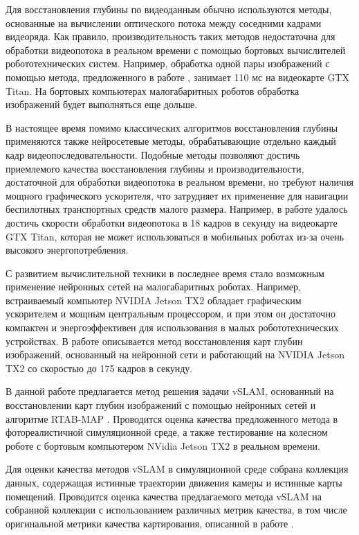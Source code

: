 \documentclass{mipt-thesis-ms}
\begin{document}
	Для восстановления глубины по видеоданным обычно используются методы, основанные на вычислении оптического потока между соседними кадрами видеоряда. Как правило, производительность таких методов недостаточна для обработки видеопотока в реальном времени с помощью бортовых вычислителей робототехнических систем. Например, обработка одной пары изображений с помощью метода, предложенного в работе \cite{ummenhofer2017demon}, занимает 110 мс на видеокарте GTX Titan. На бортовых компьютерах малогабаритных роботов обработка изображений будет выполняться еще дольше.
	
	В настоящее время помимо классических алгоритмов восстановления глубины применяются также нейросетевые методы, обрабатывающие отдельно каждый кадр видеопоследовательности. Подобные методы позволяют достичь приемлемого качества восстановления глубины  и производительности, достаточной для обработки видеопотока в реальном времени, но требуют наличия мощного графического ускорителя, что затрудняет их применение для навигации беспилотных транспортных средств малого размера. Например, в работе \cite{laina2016deeper} удалось достичь скорости обработки видеопотока в 18 кадров в секунду на видеокарте GTX Titan, которая не может использоваться в мобильных роботах из-за очень высокого энергопотребления.
	
	С развитием вычислительной техники в последнее время стало возможным применение нейронных сетей на малогабаритных роботах. Например, встраиваемый компьютер NVIDIA Jetson TX2 \cite{franklin2017nvidia} обладает графическим ускорителем и мощным центральным процессором, и при этом он достаточно компактен и энергоэффективен для использования в малых робототехнических устройствах. В работе \cite{wofk2019fastdepth} описывается метод восстановления карт глубин изображений, основанный на нейронной сети и работающий на NVIDIA Jetson TX2 со скоростью до 175 кадров в секунду.
	
	В данной работе предлагается метод решения задачи vSLAM, основанный на восстановлении карт глубин изображений с помощью нейронных сетей и алгоритме RTAB-MAP \cite{labbe2011memory}. Проводится оценка качества предложенного метода в фотореалистичной симуляционной среде, а также тестирование на колесном роботе с бортовым компьютером NVidia Jetson TX2 в реальном времени.
	
	Для оценки качества методов vSLAM в симуляционной среде собрана коллекция данных, содержащая истинные траектории движения камеры и истинные карты помещений. Проводится оценка качества предлагаемого метода vSLAM на собранной коллекции с использованием различных метрик качества, в том числе оригинальной метрики качества картирования, описанной в работе \cite{bokovoy2021assessment}.
	
\end{document}

